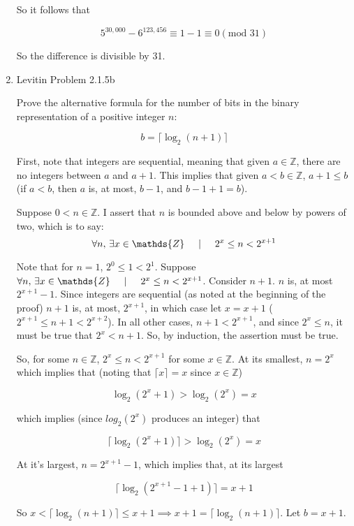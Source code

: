 \documentclass[a4paper,12pt]{article}
\newcommand\tab[1][0.5cm]{\hspace*{#1}}
\begin{document}
\begin{enumerate}
    So it follows that

    $$5^{30,000} - 6^{123,456} \equiv 1 - 1 \equiv 0 (\text{mod } 31)$$

    So the difference is divisible by 31.

    \item Levitin Problem 2.1.5b

    Prove the alternative formula for the number of bits in the binary representation of a positive integer $n$:

    $$b = \lceil \log_2(n+1)\rceil$$

    First, note that integers are sequential, meaning that given $a \in \mathds{Z}$, there are no integers between $a$ and $a + 1$. This implies that given $a < b \in \mathds{Z}$, $a + 1 \leq b$ (if $a < b$, then $a$ is, at most, $b - 1$, and $b - 1 + 1 = b$).

    Suppose $0 < n \in \mathds{Z}$. I assert that $n$ is bounded above and below by powers of two, which is to say:
    $$\forall n,\,\exists x \in \mathds{Z}\tab|\tab 2^x \leq n < 2^{x+1}$$

    Note that for $n = 1$, $2^0 \leq 1 < 2^1$. Suppose $\forall n,\,\exists x \in \mathds{Z}\tab|\tab 2^x \leq n < 2^{x+1}$. Consider $n + 1$. $n$ is, at most $2^{x + 1} - 1$. Since integers are sequential (as noted at the beginning of the proof) $n + 1$ is, at most, $2^{x + 1}$, in which case let $x = x + 1$ ($2^{x + 1} \leq n + 1 < 2^{x + 2}$). In all other cases, $n + 1 < 2^{x + 1}$, and since $2^{x} \leq n$, it must be true that $2^{x} < n + 1$. So, by induction, the assertion must be true.

    So, for some $n \in \mathds{Z}$, $2^{x} \leq n < 2^{x + 1}$ for some $x \in \mathds{Z}$. At its smallest, $n = 2^{x}$ which implies that (noting that $\lceil x \rceil = x$ since $x \in \mathds{Z}$)

    $$\log_2(2^{x}+1) > \log_2(2^{x}) = x $$

    which implies (since $log_2(2^{x})$ produces an integer) that 

    $$\lceil \log_2(2^{x}+1) \rceil > \log_2(2^{x}) = x $$

    At it's largest, $n = 2^{x + 1} - 1$, which implies that, at its largest

    $$\lceil \log_2(2^{x + 1} - 1 + 1 ) \rceil =  x + 1$$

    So  $x < \lceil \log_2(n + 1) \rceil \leq x + 1\implies x + 1 = \lceil \log_2(n + 1) \rceil$. Let $b = x + 1$.


\end{enumerate}
\end{document}
